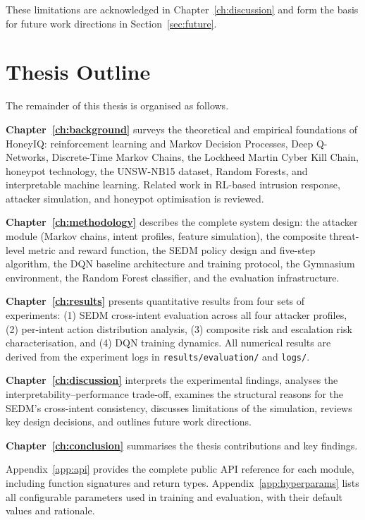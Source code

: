 These limitations are acknowledged in Chapter~\ref{ch:discussion} and
form the basis for future work directions in Section~\ref{sec:future}.

\section{Thesis Outline}

The remainder of this thesis is organised as follows.

\noindent\textbf{Chapter~\ref{ch:background}} surveys the theoretical and
empirical foundations of HoneyIQ: reinforcement learning and Markov Decision
Processes, Deep Q-Networks, Discrete-Time Markov Chains, the Lockheed Martin
Cyber Kill Chain, honeypot technology, the UNSW-NB15 dataset, Random Forests,
and interpretable machine learning.
Related work in RL-based intrusion response, attacker simulation, and
honeypot optimisation is reviewed.

\noindent\textbf{Chapter~\ref{ch:methodology}} describes the complete system
design: the attacker module (Markov chains, intent profiles, feature
simulation), the composite threat-level metric and reward function, the
SEDM policy design and five-step algorithm, the DQN baseline architecture
and training protocol, the Gymnasium environment, the Random Forest
classifier, and the evaluation infrastructure.

\noindent\textbf{Chapter~\ref{ch:results}} presents quantitative results
from four sets of experiments: (1) SEDM cross-intent evaluation across all
four attacker profiles, (2) per-intent action distribution analysis,
(3) composite risk and escalation risk characterisation, and
(4) DQN training dynamics.
All numerical results are derived from the experiment logs in
\texttt{results/evaluation/} and \texttt{logs/}.

\noindent\textbf{Chapter~\ref{ch:discussion}} interprets the experimental
findings, analyses the interpretability--performance trade-off, examines the
structural reasons for the SEDM's cross-intent consistency, discusses
limitations of the simulation, reviews key design decisions, and outlines
future work directions.

\noindent\textbf{Chapter~\ref{ch:conclusion}} summarises the thesis
contributions and key findings.

\noindent Appendix~\ref{app:api} provides the complete public API reference
for each module, including function signatures and return types.
Appendix~\ref{app:hyperparams} lists all configurable parameters used in
training and evaluation, with their default values and rationale.
